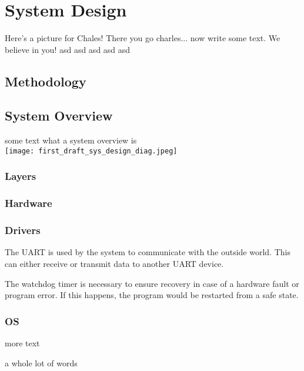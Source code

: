 \chapter{System Design}

Here's a picture for Chales!
There you go charles... now write some text. We believe in you!
asd
asd
asd
asd
asd

\section{Methodology}

\section{System Overview}
some text what a system overview is \\
\texttt{[image: first\_draft\_sys\_design\_diag.jpeg]}

\subsection{Layers}


\subsection{Hardware}

\subsection{Drivers}
\begin{description}[align=left]
	\item [\textbf{UART driver}] The UART is used by the system to communicate with the outside
	world. This can either receive or transmit data to another UART device.
	\item [\textbf{Watchdog timer driver}] The watchdog timer is necessary to ensure recovery
	in case of a hardware fault or program error. If this happens, the program would be restarted
	from a safe state. 
	
\end{description}

\subsection{OS}
\begin{description}[align=left]
	\item [\textbf{scheduler}] more text
	\item [\textbf{scheduler}] a whole lot of words
\end{description}
